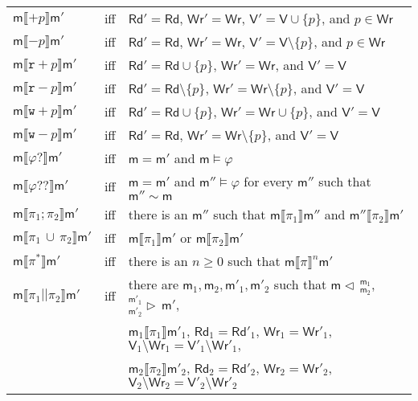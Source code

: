 \documentclass{llncs}
\newcommand{\modl}{\mathsf m}
\newcommand{\mrg}[3]{ ^{#2}_{#3} \triangleright \, #1 }
\newcommand{\pll}{ {||} }							%
\newcommand{\splt}[3]{ #1 \triangleleft \, ^{#2}_{#3} }
\newcommand{\readset}{\mathsf{Rd}}
\newcommand{\valuset}{\mathsf{V}}
\newcommand{\writeset}{\mathsf{Wr}}
\newcommand{\testendo}{?\!\!?}			%
\newcommand{\testpdl}{?}				%
\newcommand{\assgntopR}[1]{{\mathtt r {+} #1}}
\newcommand{\assgnbotR}[1]{{\mathtt r {-} #1}}
\newcommand{\assgntopW}[1]{{\mathtt w {+} #1}}
\newcommand{\assgnbotW}[1]{{\mathtt w {-} #1}}
\newcommand{\assgntopV}[1]{{\mathtt {+} #1}}
\newcommand{\assgnbotV}[1]{{\mathtt {-} #1}}
\newcommand{\intPgm}[1]{\llbracket #1 \rrbracket}
\newcommand{\ldia}[1]{ \big\langle #1 \big\rangle}
\newcommand{\leqv}{ \leftrightarrow }
\newcommand{\ndet}{\,{\cup}\,}
\renewcommand{\phi}{\varphi}
\newcommand{\propset}{\mathbb P}
\newcommand{\propsetOf}[1]{\propset_{#1}}
\begin{document}
\begin{center}\begin{tabular}{lll}
$\modl \intPgm{ \assgntopV{p} } \modl'$ & iff & $\readset' = \readset$, $\writeset' = \writeset $, $\valuset' = \valuset \cup \{p\} $, and $p \in \writeset$
\\
$\modl \intPgm{ \assgnbotV{p} } \modl'$ & iff & $\readset' = \readset$, $\writeset' = \writeset $, $\valuset' = \valuset \setminus \{p\} $, and $p \in \writeset$
\\
$\modl \intPgm{ \assgntopR{p} } \modl'$ & iff & $\readset' = \readset \cup \{p\} $, $\writeset' = \writeset $, and $\valuset'= \valuset$
\\
$\modl \intPgm{ \assgnbotR{p} } \modl'$ & iff & $\readset' = \readset \setminus \{p\} $, $\writeset' = \writeset \setminus \{p\}$, and $\valuset'= \valuset$
\\
$\modl \intPgm{ \assgntopW{p} } \modl'$ & iff & $\readset' = \readset \cup \{p\} $, $\writeset' = \writeset \cup \{p\} $, and $\valuset' = \valuset$ 
\\
$\modl \intPgm{ \assgnbotW{p} } \modl'$ & iff & $\readset' = \readset$, $\writeset' = \writeset  \setminus \{p\} $, and $\valuset' = \valuset$ 
\\
$\modl \intPgm{ \phi \testpdl }\modl'$ & iff & $\modl = \modl'$ and $\modl \models \phi$ 
\\
$\modl \intPgm{ \phi \testendo }\modl'$ & iff & $\modl = \modl'$ and $\modl'' \models \phi$ for every $\modl''$ such that $\modl'' \sim \modl$
\\
$\modl \intPgm{ \pi_1 ; \pi_2 } \modl'$ & iff & there is an $\modl''$ such that $\modl \intPgm{ \pi_1 } \modl''$ and 
												$\modl'' \intPgm{ \pi_2 } \modl'$
\\
$\modl \intPgm{ \pi_1 \ndet \pi_2 } \modl'$ & iff & $\modl \intPgm{ \pi_1 } \modl'$ or $\modl \intPgm{ \pi_2 } \modl'$ 
\\
$\modl \intPgm{ \pi^\ast } \modl'$ & iff & there is an $n \geq 0 $ such that $\modl \intPgm{ \pi } ^n \modl'$ 
\\
$\modl \intPgm{ \pi_1 \pll \pi_2 } \modl'$ & iff & there are $\modl_1, \modl_2, \modl'_1, \modl'_2$ such that %
$\splt{\modl}{\modl_1} {\modl_2} $, $\mrg{\modl'}{\modl'_1} {\modl'_2} $, \\&&
$\modl_1 \intPgm{ \pi_1 } \modl'_1$, 
$\readset_1 = \readset'_1 $, $\writeset_1 = \writeset'_1 $, $\valuset_1 \setminus \writeset_1 = \valuset'_1 \setminus \writeset'_1 , $ \\&&
$\modl_2 \intPgm{ \pi_2 } \modl'_2$, 
$\readset_2 = \readset'_2 $, $\writeset_2 = \writeset'_2 $, $\valuset_2 \setminus \writeset_2 = \valuset'_2 \setminus \writeset'_2 $ 
\end{tabular}\end{center}
\end{document}
